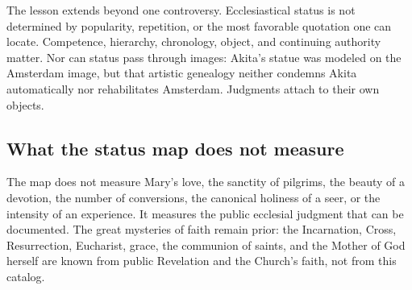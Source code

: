 The lesson extends beyond one controversy. Ecclesiastical status is not determined by popularity, repetition, or the most favorable quotation one can locate. Competence, hierarchy, chronology, object, and continuing authority matter. Nor can status pass through images: Akita's statue was modeled on the Amsterdam image, but that artistic genealogy neither condemns Akita automatically nor rehabilitates Amsterdam. Judgments attach to their own objects.

\subsection{What the status map does not measure}

The map does not measure Mary's love, the sanctity of pilgrims, the beauty of a devotion, the number of conversions, the canonical holiness of a seer, or the intensity of an experience. It measures the public ecclesial judgment that can be documented. The great mysteries of faith remain prior: the Incarnation, Cross, Resurrection, Eucharist, grace, the communion of saints, and the Mother of God herself are known from public Revelation and the Church's faith, not from this catalog.
